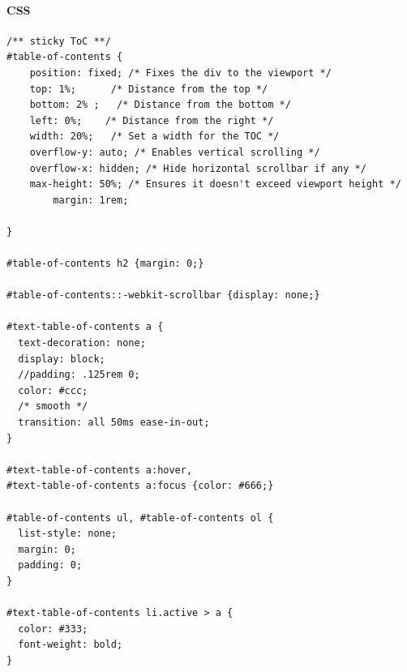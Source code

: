 \documentclass[11pt]{article}
\begin{document}
\paragraph{CSS}
\label{sec:org82f8061}
\begin{verbatim}
/** sticky ToC **/
#table-of-contents {
    position: fixed; /* Fixes the div to the viewport */
    top: 1%;      /* Distance from the top */
    bottom: 2% ;   /* Distance from the bottom */
    left: 0%;    /* Distance from the right */
    width: 20%;   /* Set a width for the TOC */
    overflow-y: auto; /* Enables vertical scrolling */
    overflow-x: hidden; /* Hide horizontal scrollbar if any */
    max-height: 50%; /* Ensures it doesn't exceed viewport height */
        margin: 1rem;

}

#table-of-contents h2 {margin: 0;}

#table-of-contents::-webkit-scrollbar {display: none;}

#text-table-of-contents a {
  text-decoration: none;
  display: block;
  //padding: .125rem 0;
  color: #ccc;
  /* smooth */
  transition: all 50ms ease-in-out;
}

#text-table-of-contents a:hover,
#text-table-of-contents a:focus {color: #666;}

#table-of-contents ul, #table-of-contents ol {
  list-style: none;
  margin: 0;
  padding: 0;
}

#text-table-of-contents li.active > a {
  color: #333;
  font-weight: bold;
}
\end{verbatim}
\end{document}
